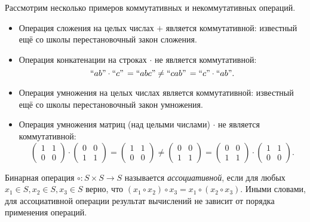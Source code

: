 \begin{example} Рассмотрим несколько примеров коммутативных и некоммутативных операций.
	\begin{itemize}
		\item Операция сложения на целых числах $+$ является коммутативной: известный ещё со школы перестановочный закон сложения.
		\item Операция конкатенации на строках $\cdot$ не является коммутативной: $$``ab" \cdot ``c" \, = ``abc" \neq ``cab" \, = ``c" \cdot ``ab".$$
		\item Операция умножения на целых числах является коммутативной: известный ещё со школы перестановочный закон умножения.
		\item Операция умножения матриц (над целыми числами) $\cdot$ не является коммутативной:
		$$\begin{pmatrix}
		1 & 1 \\ 0 & 0
		\end{pmatrix}
		\cdot
		\begin{pmatrix}
		0 & 0 \\ 1 & 1
		\end{pmatrix}
		=
		\begin{pmatrix}
		1 & 1 \\ 0 & 0
		\end{pmatrix}
		\neq
		\begin{pmatrix}
			0 & 0 \\ 1 & 1
		\end{pmatrix}
		=
		\begin{pmatrix}
		0 & 0 \\ 1 & 1
		\end{pmatrix}
		\cdot
		\begin{pmatrix}
		1 & 1 \\ 0 & 0
		\end{pmatrix}
		.$$
	\end{itemize}
\end{example}

\begin{definition}
Бинарная операция $\circ : S \times S \to S$ называется \emph{ассоциативной}, если для любых  $x_1 \in S, x_2 \in S, x_3 \in S$ верно, что  $(x_1 \circ x_2) \circ x_3 = x_1 \circ (x_2 \circ x_3)$. Иными словами, для ассоциативной операции результат вычислений не зависит от порядка применения операций.
\end{definition}

